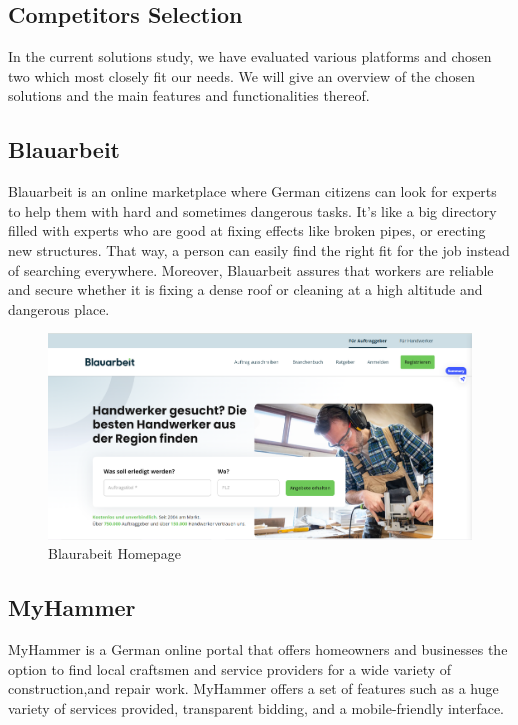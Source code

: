\subsection{Competitors Selection}
In the current solutions study, we have evaluated various platforms and chosen two which most closely fit our needs. We will give an overview of the chosen solutions and the main features and functionalities thereof.

\subsection{Blauarbeit}
Blauarbeit is an online marketplace where German citizens can look for experts to help them with hard and sometimes dangerous tasks.
It's like a big directory filled with experts who are good at fixing effects like broken pipes, or erecting new structures.
That way, a person can easily find the right fit for the job instead of searching everywhere. Moreover, Blauarbeit assures that workers are reliable and secure whether it is fixing a dense roof or cleaning at a high altitude and dangerous place.


\begin{figure}[H]
    \centering
    \includegraphics[width=\linewidth]{src/assets/chapters/Blaurabeit.PNG}
    \caption{Blaurabeit Homepage}
    \label{fig:blaurabeit_image}
\end{figure}

\newpage
\subsection{MyHammer}
MyHammer is a German online portal that offers homeowners and businesses the option to find local craftsmen and service providers for a wide variety of construction,and repair work.
MyHammer offers a set of features such as a huge variety of services provided, transparent bidding, and a mobile-friendly interface.


